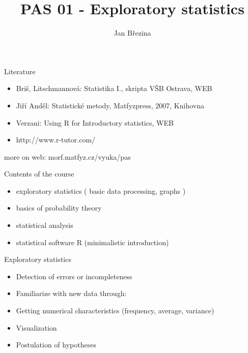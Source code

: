 \documentclass[smaller]{beamer}
\title{PAS 01 - Exploratory statistics}
\author{Jan B\v rezina}
\institute %
{
  Technical University of Liberec
}
\begin{document}
\begin{frame}
  \titlepage
\end{frame}


\begin{frame}{Literature} 
\begin{itemize}
 \item Briš, Litschmannová: Statistika I., skripta VŠB Ostrava, WEB
 \item Jiří Anděl: Statistické metody, Matfyzpress, 2007, Knihovna
 \item Verzani: Using R for Introductory statistics, WEB
 \item http://www.r-tutor.com/
\end{itemize}
more on web: morf.matfyz.cz/vyuka/pas
\end{frame}


\begin{frame}{Contents of the course}
 \begin{itemize}
  \item exploratory statistics ( basic data processing, graphs )
  \item basics of probability theory 
  \item statistical analysis 
  \item statistical software R (minimalistic introduction)
 \end{itemize}
\end{frame}

\begin{frame}{Exploratory statistics}
\begin{itemize}
 \item Detection of errors or incompleteness
 \item Familiarize with new data through:
 \item Getting numerical characteristics (frequency, average, variance)
 \item Visualization
 \item Postulation of hypotheses
\end{itemize}
 
\end{frame}
\end{document}
